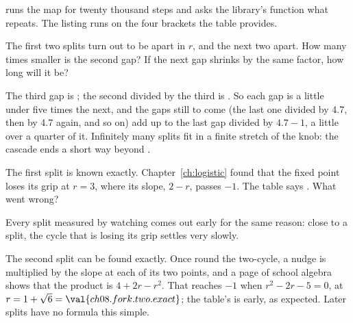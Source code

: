 \noindent
{} runs the map for twenty thousand steps and asks the
library's  function what repeats. The listing runs 
on the four brackets the table provides.

\begin{think}
The first two splits turn out to be  apart in $r$, and the
next two  apart. How many times smaller is the second gap?
If the next gap shrinks by the same factor, how long will it be?
\end{think}


\noindent
The third gap is ; the second divided by the third is
. So each gap is a little under five times the next, and
the gaps still to come (the last one divided by \num{4.7}, then by \num{4.7}
again, and so on) add up to the last gap divided by $\num{4.7} - 1$, a little
over a quarter of it. Infinitely many splits fit in a finite stretch of the
knob: the cascade ends a short way beyond .

\begin{think}
The first split is known exactly. Chapter~\ref{ch:logistic} found that the
fixed point loses its grip at $r = 3$, where its slope, $2 - r$, passes
$-1$. The table says . What went wrong?
\end{think}
Every split measured by watching comes out early for the same reason: close
to a split, the cycle that is losing its grip settles very slowly.

\begin{note}
The second split can be found exactly. Once round the two-cycle, a nudge is
multiplied by the slope at each of its two points, and a page of school
algebra shows that the product is $4 + 2r - r^{2}$. That reaches $-1$ when
$r^{2} - 2r - 5 = 0$, at $r = 1 + \sqrt{6} = \val{ch08.fork.two.exact}$; the
table's  is early, as expected. Later splits have no
formula this simple.
\end{note}

